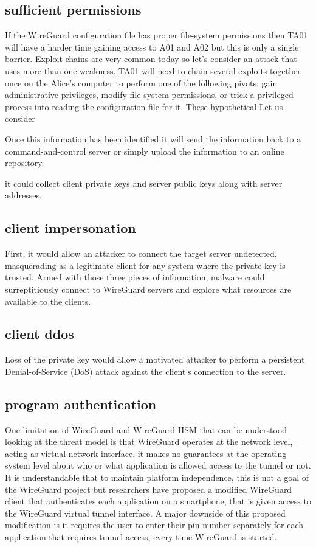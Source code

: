 \documentclass [11pt, proquest] {uwthesis}[2020/02/24]
\begin{document}
\subsection{sufficient permissions}
If the WireGuard configuration file has proper file-system permissions then TA01 will have a harder time gaining access to A01 and A02 but this is only a single barrier. Exploit chains are very common today so let's consider an attack that uses more than one weakness. TA01 will need to chain several exploits together once on the Alice's computer to perform one of the following pivots: gain administrative privileges, modify file system permissions, or trick a privileged process into reading the configuration file for it. These hypothetical 
Let us consider

Once this information has been identified it will send the information back to a command-and-control server or simply upload the information to an online repository.

it could collect client private keys and server public keys along with server addresses.

\subsection{client impersonation}
First, it would allow an attacker to connect the target server undetected, masquerading as a legitimate client for any system where the private key is trusted. 
Armed with those three pieces of information, malware could surreptitiously connect to WireGuard servers and explore what resources are available to the clients.

\subsection{client ddos}
Loss of the private key would allow a motivated attacker to perform a persistent Denial-of-Service (DoS) attack against the client's connection to the server.


\subsection{program authentication}
One limitation of WireGuard and WireGuard-HSM that can be understood looking at the threat model is that WireGuard operates at the network level, acting as virtual network interface, it makes no guarantees at the operating system level about who or what application is allowed access to the tunnel or not. It is understandable that to maintain platform independence, this is not a goal of the WireGuard project but researchers have proposed a modified WireGuard client that authenticates each application on a smartphone, that is given access to the WireGuard virtual tunnel interface. A major downside of this proposed modification is it requires the user to enter their pin number separately for each application that requires tunnel access, every time WireGuard is started.\cite{wu_sewg_2020}
\end{document}
